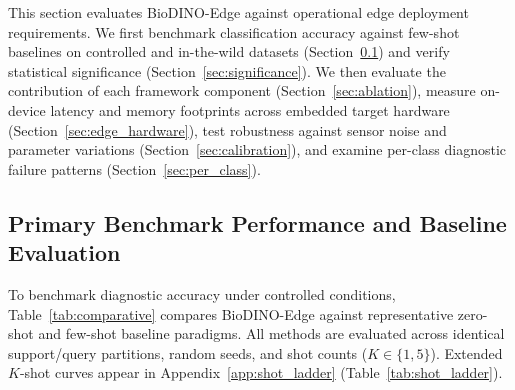 \documentclass[preprint,12pt]{elsarticle}
\begin{document}
This section evaluates BioDINO-Edge against operational edge deployment requirements. We first benchmark classification accuracy against few-shot baselines on controlled and in-the-wild datasets (Section~\ref{sec:comparative_results}) and verify statistical significance (Section~\ref{sec:significance}). We then evaluate the contribution of each framework component (Section~\ref{sec:ablation}), measure on-device latency and memory footprints across embedded target hardware (Section~\ref{sec:edge_hardware}), test robustness against sensor noise and parameter variations (Section~\ref{sec:calibration}), and examine per-class diagnostic failure patterns (Section~\ref{sec:per_class}).

\subsection{Primary Benchmark Performance and Baseline Evaluation}
\label{sec:comparative_results}

To benchmark diagnostic accuracy under controlled conditions, Table~\ref{tab:comparative} compares BioDINO-Edge against representative zero-shot and few-shot baseline paradigms. All methods are evaluated across identical support/query partitions, random seeds, and shot counts ($K \in \{1, 5\}$). Extended $K$-shot curves appear in Appendix~\ref{app:shot_ladder} (Table~\ref{tab:shot_ladder}).
\end{document}
